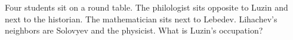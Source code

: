 \problem
Four students sit on a round table.
The philologist sits opposite to Luzin and next to the historian.
The mathematician sits next to Lebedev.
Lihachev's neighbors are Solovyev and the physicist.
What is Luzin's occupation?
\solution
\endproblem
